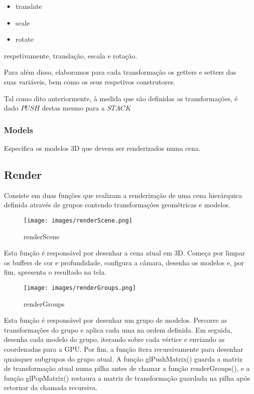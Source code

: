 \documentclass{article}
\begin{document}
\begin{itemize}
    \item translate 
    \item scale 
    \item rotate 
\end{itemize}

respetivamente, translação, escala e rotação.

Para além disso, elaboramos para cada transformação os getters e setters das suas variáveis, bem como os seus respetivos construtores.

Tal como dito anteriormente, à medida que são definidas as transformações, é dado $PUSH$ destas mesmo para a $STACK$

\subsubsection{Models}

Especifica os modelos 3D que devem ser renderizados numa cena.

\newpage
\subsection{Render}

Consiste em duas funções que realizam a renderização de uma cena hierárquica definida através de grupos contendo transformações geométricas e modelos.

\begin{figure}[h]
    \centering
    \texttt{[image: images/renderScene.png]}
    \caption{renderScene}
    \label{fig:exemplo}
\end{figure}

Esta função é responsável por desenhar a cena atual em 3D. Começa por limpar os buffers de cor e profundidade, configura a câmara, desenha os modelos e, por fim, apresenta o resultado na tela.

\begin{figure}[h]
    \centering
    \texttt{[image: images/renderGroups.png]}
    \caption{renderGroups}
    \label{fig:exemplo}
\end{figure}

Esta função é responsável por desenhar um grupo de modelos. Percorre as transformações do grupo e aplica cada uma na ordem definida. Em seguida, desenha cada modelo do grupo, iterando sobre cada vértice e enviando as coordenadas para a GPU. Por fim, a função itera recursivamente para desenhar quaisquer subgrupos do grupo atual. A função glPushMatrix() guarda a matriz de transformação atual numa pilha antes de chamar a função renderGroups(), e a função glPopMatrix() restaura a matriz de transformação guardada na pilha após retornar da chamada recursiva.
\end{document}
